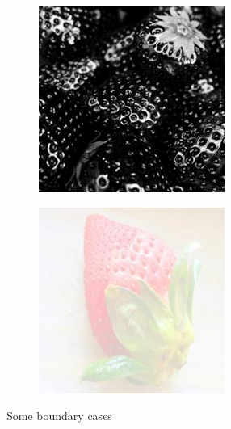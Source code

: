 \documentclass[../main.tex]{subfiles}
\begin{document}
\begin{figure}[h!]
\begin{subfigure}[b]{0.2\linewidth}
  \end{subfigure}
  \begin{subfigure}[b]{0.2\linewidth}
    \includegraphics[width=\linewidth]{03-boundary/edits.png}
  \end{subfigure}
  \begin{subfigure}[b]{0.2\linewidth}
    \includegraphics[width=\linewidth]{03-boundary/faded.png}
  \end{subfigure}
  \caption{Some boundary cases}
  \label{fig:img-boundary}
\end{figure}
\end{document}
